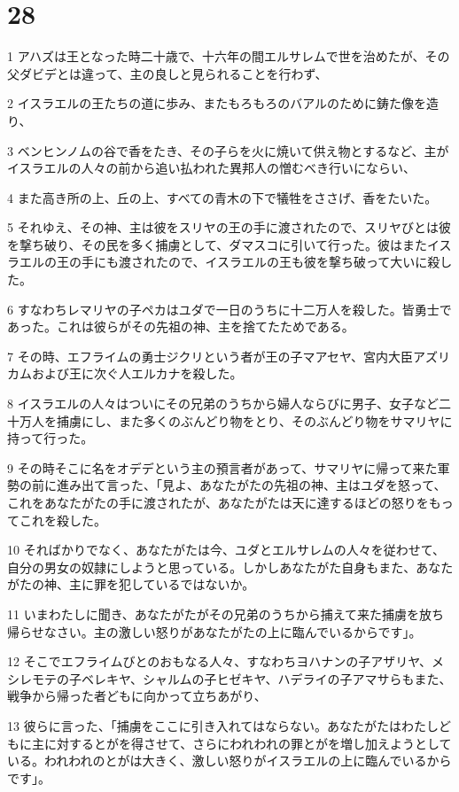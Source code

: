 \chapter{28}

\par 1 アハズは王となった時二十歳で、十六年の間エルサレムで世を治めたが、その父ダビデとは違って、主の良しと見られることを行わず、
\par 2 イスラエルの王たちの道に歩み、またもろもろのバアルのために鋳た像を造り、
\par 3 ベンヒンノムの谷で香をたき、その子らを火に焼いて供え物とするなど、主がイスラエルの人々の前から追い払われた異邦人の憎むべき行いにならい、
\par 4 また高き所の上、丘の上、すべての青木の下で犠牲をささげ、香をたいた。
\par 5 それゆえ、その神、主は彼をスリヤの王の手に渡されたので、スリヤびとは彼を撃ち破り、その民を多く捕虜として、ダマスコに引いて行った。彼はまたイスラエルの王の手にも渡されたので、イスラエルの王も彼を撃ち破って大いに殺した。
\par 6 すなわちレマリヤの子ペカはユダで一日のうちに十二万人を殺した。皆勇士であった。これは彼らがその先祖の神、主を捨てたためである。
\par 7 その時、エフライムの勇士ジクリという者が王の子マアセヤ、宮内大臣アズリカムおよび王に次ぐ人エルカナを殺した。
\par 8 イスラエルの人々はついにその兄弟のうちから婦人ならびに男子、女子など二十万人を捕虜にし、また多くのぶんどり物をとり、そのぶんどり物をサマリヤに持って行った。
\par 9 その時そこに名をオデデという主の預言者があって、サマリヤに帰って来た軍勢の前に進み出て言った、「見よ、あなたがたの先祖の神、主はユダを怒って、これをあなたがたの手に渡されたが、あなたがたは天に達するほどの怒りをもってこれを殺した。
\par 10 そればかりでなく、あなたがたは今、ユダとエルサレムの人々を従わせて、自分の男女の奴隷にしようと思っている。しかしあなたがた自身もまた、あなたがたの神、主に罪を犯しているではないか。
\par 11 いまわたしに聞き、あなたがたがその兄弟のうちから捕えて来た捕虜を放ち帰らせなさい。主の激しい怒りがあなたがたの上に臨んでいるからです」。
\par 12 そこでエフライムびとのおもなる人々、すなわちヨハナンの子アザリヤ、メシレモテの子ベレキヤ、シャルムの子ヒゼキヤ、ハデライの子アマサらもまた、戦争から帰った者どもに向かって立ちあがり、
\par 13 彼らに言った、「捕虜をここに引き入れてはならない。あなたがたはわたしどもに主に対するとがを得させて、さらにわれわれの罪とがを増し加えようとしている。われわれのとがは大きく、激しい怒りがイスラエルの上に臨んでいるからです」。
